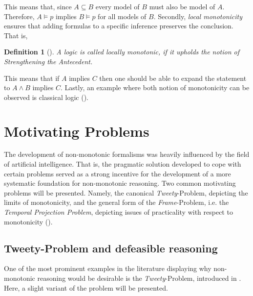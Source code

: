\documentclass{extarticle}
\newtheorem{mydef}[thm]{Definition}
\begin{document}
This means that, since $A \subseteq B$ every model of $B$ must also be  model of $A$. Therefore, $A \models p$ implies $B \models p$ for all models of $B$.
Secondly, \emph{local monotonicity} ensures that adding formulas to a specific inference preserves the conclusion. That is, 

\begin{mydef}[\cite{bochman2005explanatory}]
    A logic is called locally monotonic, if it upholds the notion of \emph{Strengthening the Antecedent}.
\end{mydef}


This means that if $A$ implies $C$ then one should be able to expand the statement to $A \wedge B$ implies $C$. Lastly, an example where both notion of monotonicity can be observed is classical logic
(\cite{bochman2005explanatory,BOCHMAN2007557}). 




\section{Motivating Problems}
The development of non-monotonic formalisms was heavily influenced by the field of artificial intelligence. That is, the pragmatic solution developed to cope with certain problems served as a strong incentive for the development of a more systematic foundation for non-monotonic reasoning. Two common motivating problems will be presented. Namely, the canonical \emph{Tweety}-Problem, depicting the limits of monotonicity, and the general form of the \emph{Frame}-Problem, i.e. the \emph{Temporal Projection Problem}, depicting issues of practicality with respect to monotonicity (\cite{BOCHMAN2007557}).


\subsection{Tweety-Problem and defeasible reasoning}
One of the most prominent examples in the literature displaying why non-monotonic reasoning would be desirable is the \emph{Tweety}-Problem, introduced in \cite{reiter1980logic}. Here, a slight variant of the problem will be presented.\\
\end{document}
